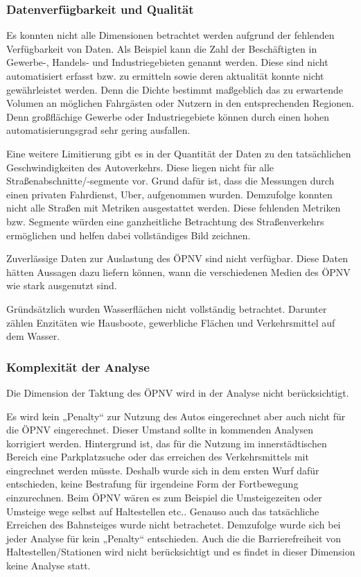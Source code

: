 \subsubsection{Datenverfügbarkeit und Qualität}
Es konnten nicht alle Dimensionen betrachtet werden aufgrund der fehlenden Verfügbarkeit von Daten. Als Beispiel kann die Zahl der Beschäftigten in Gewerbe-, Handels- und Industriegebieten genannt werden. Diese sind nicht automatisiert erfasst bzw. zu ermitteln​ sowie deren aktualität konnte nicht gewährleistet werden.
Denn die Dichte bestimmt maßgeblich das zu erwartende Volumen an möglichen Fahrgästen oder Nutzern in den entsprechenden Regionen. Denn großflächige Gewerbe oder Industriegebiete können durch einen hohen automatisierungsgrad sehr gering ausfallen.

Eine weitere Limitierung gibt es in der Quantität der Daten zu den tatsächlichen Geschwindigkeiten des Autoverkehrs. Diese liegen nicht für alle Straßenabschnitte/-segmente vor​. Grund dafür ist, dass die Messungen durch einen privaten Fahrdienst, Uber, aufgenommen wurden. Demzufolge konnten nicht alle Straßen mit Metriken ausgestattet werden. 
Diese fehlenden Metriken bzw. Segmente würden eine ganzheitliche Betrachtung des Straßenverkehrs ermöglichen und helfen dabei vollständiges Bild zeichnen.

Zuverlässige Daten zur Auslastung des ÖPNV sind nicht verfügbar​. Diese Daten hätten Aussagen dazu liefern können, wann die verschiedenen Medien des ÖPNV wie stark ausgenutzt sind.

Gründsätzlich wurden Wasserflächen nicht vollständig betrachtet. Darunter zählen Enzitäten wie Hausboote, gewerbliche Flächen und Verkehrsmittel auf dem Wasser.


\subsubsection{Komplexität der Analyse}
Die Dimension der Taktung des ÖPNV wird in der Analyse nicht berücksichtigt​.

Es wird kein „Penalty“ zur Nutzung des Autos eingerechnet aber auch nicht für die ÖPNV eingerechnet​. Dieser Umstand sollte in kommenden Analysen korrigiert werden.
Hintergrund ist, das für die Nutzung im innerstädtischen Bereich eine Parkplatzsuche oder das erreichen des Verkehrsmittels mit eingrechnet werden müsste.
Deshalb wurde sich in dem ersten Wurf dafür entschieden, keine Bestrafung für irgendeine Form der Fortbewegung einzurechnen. 
Beim ÖPNV wären es zum Beispiel die Umsteigezeiten oder Umsteige wege selbst auf Haltestellen etc.. 
Genauso auch das tatsächliche Erreichen des Bahnsteiges wurde nicht betrachetet. Demzufolge wurde sich bei jeder Analyse für kein „Penalty“ entschieden.
Auch die die Barrierefreiheit von Haltestellen/Stationen wird nicht berücksichtigt​ und es findet in dieser Dimension keine Analyse statt.

